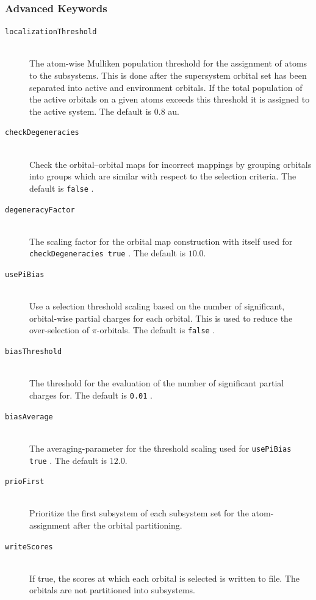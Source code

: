 \documentclass[bibliography=totocnumbered,a4paper,10pt,oneside]{scrbook}
\newcommand{\ttt}[1]{%
  \begingroup\setlength{\fboxsep}{1pt}%
  \colorbox{serenity-green!30}{\texttt{\hspace*{2pt}\vphantom{(g}#1\hspace*{2pt}}}%
  \endgroup
}
\begin{document}
\subsubsection{Advanced Keywords}
\begin{description}
    \item [\texttt{localizationThreshold}]\hfill \\
    The atom-wise Mulliken population threshold for the assignment of atoms to the subsystems. This is done
    after the supersystem orbital set has been separated into active and environment orbitals. If the total
    population of the active orbitals on a given atoms exceeds this threshold it is assigned to the active
    system. The default is $0.8$ au.
    \item [\texttt{checkDegeneracies}]\hfill \\
    Check the orbital--orbital maps for incorrect mappings by grouping orbitals into groups which are similar
    with respect to the selection criteria. The default is \ttt{false}.
    \item [\texttt{degeneracyFactor}]\hfill \\
    The scaling factor for the orbital map construction with itself used for
    \ttt{checkDegeneracies true}. The default is $10.0$.
    \item [\texttt{usePiBias}]\hfill \\
    Use a selection threshold scaling based on the number of significant, orbital-wise partial charges for
    each orbital. This is used to reduce the over-selection of $\pi$-orbitals. The default is \ttt{false}.
    \item [\texttt{biasThreshold}]\hfill \\
    The threshold for the evaluation of the number of significant partial charges for. The default is
    \ttt{0.01}.
    \item [\texttt{biasAverage}]\hfill \\
    The averaging-parameter for the threshold scaling used for \ttt{usePiBias true}.
    The default is $12.0$.
    \item [\texttt{prioFirst}]\hfill \\
    Prioritize the first subsystem of each subsystem set for the atom-assignment after
    the orbital partitioning.
    \item [\texttt{writeScores}]\hfill \\
    If true, the scores at which each orbital is selected is written to file.
    The orbitals are not partitioned into subsystems.

\end{description}
\end{document}
